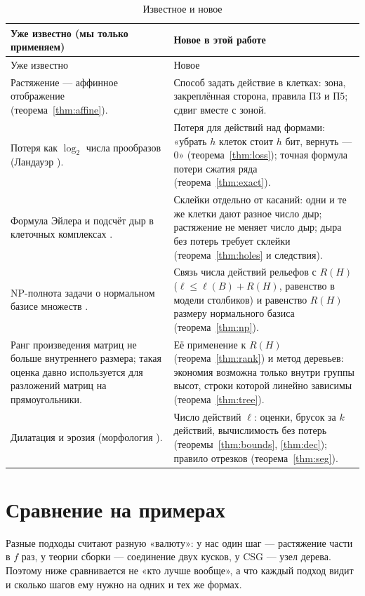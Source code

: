 \documentclass[11pt,a4paper]{article}
\theoremstyle{plain}
\theoremstyle{definition}
\theoremstyle{remark}
\begin{document}
\begin{longtable}{p{}p{}}
\caption{Известное и новое}\label{tab:new}\\
\toprule
Уже известно (мы только применяем) & Новое в этой работе\\
\midrule
\endfirsthead
\toprule Уже известно & Новое\\ \midrule \endhead
Растяжение — аффинное отображение (теорема~\ref{thm:affine}). &
Способ задать действие в клетках: зона, закреплённая сторона, правила П3 и П5; сдвиг вместе с зоной.\\
Потеря как $\log_2$ числа прообразов (Ландауэр \cite{landauer}). &
Потеря для действий над формами: «убрать $h$ клеток стоит $h$ бит, вернуть — 0» (теорема~\ref{thm:loss}); точная формула потери сжатия ряда (теорема~\ref{thm:exact}).\\
Формула Эйлера и подсчёт дыр в клеточных комплексах \cite{kaczynski}. &
Склейки отдельно от касаний: одни и те же клетки дают разное число дыр; растяжение не меняет число дыр; дыра без потерь требует склейки (теорема~\ref{thm:holes} и следствия).\\
NP-полнота задачи о нормальном базисе множеств \cite{jiang}. &
Связь числа действий рельефов с $R(H)$ ($\ell\le\ell(B)+R(H)$, равенство в модели столбиков) и равенство $R(H)$ размеру нормального базиса (теорема~\ref{thm:np}).\\
Ранг произведения матриц не больше внутреннего размера; такая оценка давно используется для разложений матриц на прямоугольники. &
Её применение к $R(H)$ (теорема~\ref{thm:rank}) и метод деревьев: экономия возможна только внутри группы высот, строки которой линейно зависимы (теорема~\ref{thm:tree}).\\
Дилатация и эрозия (морфология \cite{serra}). &
Число действий $\ell$: оценки, брусок за $k$ действий, вычислимость без потерь (теоремы~\ref{thm:bounds}, \ref{thm:dec}); правило отрезков (теорема~\ref{thm:seg}).\\
\bottomrule
\end{longtable}

\section{Сравнение на примерах}\label{sec:cmp}

Разные подходы считают разную «валюту»: у нас один шаг — растяжение части в $f$ раз, у теории сборки — соединение двух кусков, у CSG — узел дерева. Поэтому ниже сравнивается не «кто лучше вообще», а что каждый подход видит и сколько шагов ему нужно на одних и тех же формах.
\end{document}

